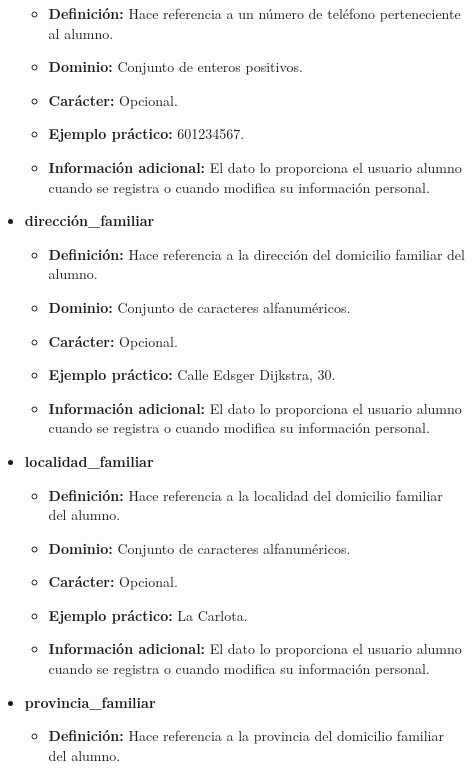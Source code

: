 \begin{description}
\begin{itemize}
\begin{itemize}
         \item \textbf{Definición:} Hace referencia a un número de teléfono perteneciente al alumno.
         \item \textbf{Dominio:} Conjunto de enteros positivos.
         \item \textbf{Carácter:}  Opcional.
         \item \textbf{Ejemplo práctico:} 601234567.
         \item \textbf{Información adicional:} El dato lo proporciona el usuario alumno cuando se registra o cuando modifica su información personal.
      \end{itemize}
   \item \textbf{dirección\_familiar}
      \begin{itemize}
         \item \textbf{Definición:} Hace referencia a la dirección del domicilio familiar del alumno.
         \item \textbf{Dominio:} Conjunto de caracteres alfanuméricos.
         \item \textbf{Carácter:}  Opcional.
         \item \textbf{Ejemplo práctico:} Calle Edsger Dijkstra, 30.
         \item \textbf{Información adicional:} El dato lo proporciona el usuario alumno cuando se registra o cuando modifica su información personal.
      \end{itemize}
   \item \textbf{localidad\_familiar}
      \begin{itemize}
         \item \textbf{Definición:} Hace referencia a la localidad del domicilio familiar del alumno.
         \item \textbf{Dominio:} Conjunto de caracteres alfanuméricos.
         \item \textbf{Carácter:}  Opcional.
         \item \textbf{Ejemplo práctico:} La Carlota.
         \item \textbf{Información adicional:} El dato lo proporciona el usuario alumno cuando se registra o cuando modifica su información personal.
      \end{itemize}
   \item \textbf{provincia\_familiar}
      \begin{itemize}
         \item \textbf{Definición:} Hace referencia a la provincia del domicilio familiar del alumno.

\end{itemize}
\end{itemize}
\end{description}
